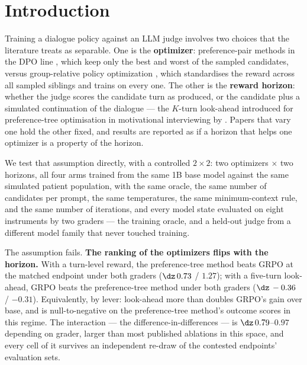 \section{Introduction}
\label{sec:intro}

Training a dialogue policy against an LLM judge involves two choices that the literature treats
as separable. One is the \textbf{optimizer}: preference-pair methods in the DPO line
\citep{rafailov2023dpo}, which keep only the best and worst of the sampled candidates, versus
group-relative policy optimization \citep{shao2024deepseekmath}, which standardises the reward
across all sampled siblings and trains on every one. The other is the \textbf{reward horizon}:
whether the judge scores the candidate turn as produced, or the candidate plus a simulated
continuation of the dialogue --- the $K$-turn look-ahead introduced for preference-tree
optimisation in motivational interviewing by \citet{baruch2025pto}. Papers that vary one hold
the other fixed, and results are reported as if a horizon that helps one optimizer is a property
of the horizon.

We test that assumption directly, with a controlled $2 \times 2$: two optimizers $\times$ two
horizons, all four arms trained from the same 1B base model against the same simulated patient
population, with the same oracle, the same number of candidates per prompt, the same
temperatures, the same minimum-context rule, and the same number of iterations, and every model
state evaluated on eight instruments by two graders --- the training oracle, and a held-out judge
from a different model family that never touched training.

The assumption fails. \textbf{The ranking of the optimizers flips with the horizon.} With a
turn-level reward, the preference-tree method beats GRPO at the matched endpoint under both
graders ($\dz\,0.73$ / $1.27$); with a five-turn look-ahead, GRPO beats the preference-tree
method under both graders ($\dz\,-0.36$ / $-0.31$). Equivalently, by lever: look-ahead more than
doubles GRPO's gain over base, and is null-to-negative on the preference-tree method's outcome
scores in this regime. The interaction --- the difference-in-differences --- is
$\dz\,0.79$--$0.97$ depending on grader, larger than most published ablations in this space, and
every cell of it survives an independent re-draw of the contested endpoints' evaluation sets.

